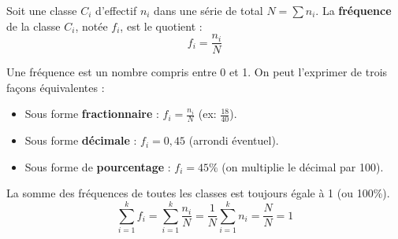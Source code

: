 \documentclass[11pt]{article}
\begin{document}
\begin{definition}
Soit une classe $C_i$ d'effectif $n_i$ dans une série de total $N = \sum n_i$.
La \textbf{fréquence} de la classe $C_i$, notée $f_i$, est le quotient :
\[ f_i = \frac{n_i}{N} \]
\end{definition}

\begin{propriete}
Une fréquence est un nombre compris entre 0 et 1. On peut l'exprimer de trois façons équivalentes :
\begin{itemize}
    \item Sous forme \textbf{fractionnaire} : $f_i = \frac{n_i}{N}$ (ex: $\frac{18}{40}$).
    \item Sous forme \textbf{décimale} : $f_i = 0,45$ (arrondi éventuel).
    \item Sous forme de \textbf{pourcentage} : $f_i = 45\%$ (on multiplie le décimal par 100).
\end{itemize}
\end{propriete}

\begin{propriete}
La somme des fréquences de toutes les classes est toujours égale à 1 (ou 100\%).
\[ \sum_{i=1}^{k} f_i = \sum_{i=1}^{k} \frac{n_i}{N} = \frac{1}{N}\sum_{i=1}^{k} n_i = \frac{N}{N} = 1 \]
\end{propriete}
\end{document}
